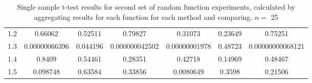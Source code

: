 \documentclass[a4paper,11pt]{article}
\begin{document}
\begin{appendices}
\begin{table}[htb]
\begin{center}
{\begin{tabular}{r|cccccc}
  1.2  &              0.66062  &   0.52511  &               0.79827  &              0.31073  &   0.23649  &                 0.75251  \\
  1.3  &  \num{0.00000066396}  &  0.044196  &  \num{0.000000042502}  &  \num{0.00000001978}  &   0.48723  &  \num{0.00000000068121}  \\
  1.4  &               0.8409  &   0.54461  &               0.28351  &              0.42718  &   0.14969  &                 0.48467  \\
  1.5  &             0.098748  &   0.63584  &               0.33856  &            0.0080649  &    0.3598  &                 0.21506  \\
  \end{tabular}
  }
  \end{center}
  \caption{Single sample t-test results for second set of random function experiments, calculated by aggregating results for each function for each method and comparing. $n=$ 25} \end{table}

\end{appendices}
\end{document}
